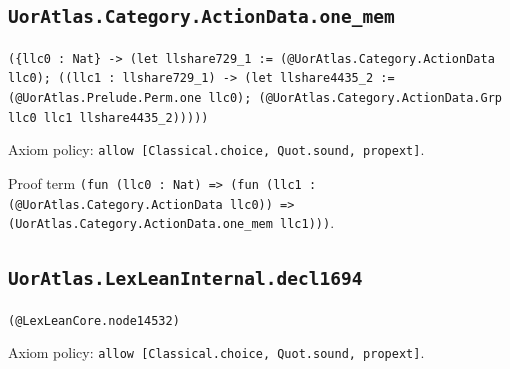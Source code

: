 \documentclass[11pt]{article}
\begin{document}
\subsection*{\texttt{UorAtlas.Category.ActionData.one\_mem}}
\noindent\texttt{(\{llc0 : Nat\} -> (let llshare729\_1 := (@UorAtlas.Category.ActionData llc0); ((llc1 : llshare729\_1) -> (let llshare4435\_2 := (@UorAtlas.Prelude.Perm.one llc0); (@UorAtlas.Category.ActionData.Grp llc0 llc1 llshare4435\_2)))))}\par
\noindent Axiom policy: \texttt{allow [Classical.choice, Quot.sound, propext]}.\par
\noindent Proof term \texttt{(fun (llc0 : Nat) => (fun (llc1 : (@UorAtlas.Category.ActionData llc0)) => (UorAtlas.Category.ActionData.one\_mem llc1)))}.\par
\subsection*{\texttt{UorAtlas.LexLeanInternal.decl1694}}
\noindent\texttt{(@LexLeanCore.node14532)}\par
\noindent Axiom policy: \texttt{allow [Classical.choice, Quot.sound, propext]}.\par
\end{document}
